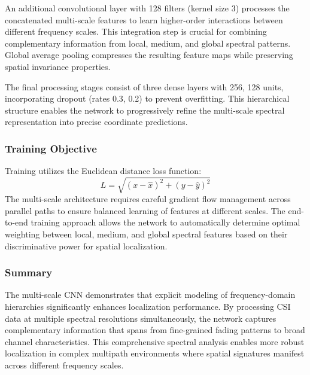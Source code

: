 An additional convolutional layer with 128 filters (kernel size 3) processes the concatenated multi-scale features to learn higher-order interactions between different frequency scales. This integration step is crucial for combining complementary information from local, medium, and global spectral patterns. Global average pooling compresses the resulting feature maps while preserving spatial invariance properties.

The final processing stages consist of three dense layers with 256, 128 units, incorporating dropout (rates 0.3, 0.2) to prevent overfitting. This hierarchical structure enables the network to progressively refine the multi-scale spectral representation into precise coordinate predictions.

\subsubsection{Training Objective}
Training utilizes the Euclidean distance loss function:
\[
L = \sqrt{(x - \hat{x})^2 + (y - \hat{y})^2}
\]
The multi-scale architecture requires careful gradient flow management across parallel paths to ensure balanced learning of features at different scales. The end-to-end training approach allows the network to automatically determine optimal weighting between local, medium, and global spectral features based on their discriminative power for spatial localization.

\subsubsection{Summary}
The multi-scale CNN demonstrates that explicit modeling of frequency-domain hierarchies significantly enhances localization performance. By processing CSI data at multiple spectral resolutions simultaneously, the network captures complementary information that spans from fine-grained fading patterns to broad channel characteristics. This comprehensive spectral analysis enables more robust localization in complex multipath environments where spatial signatures manifest across different frequency scales.

